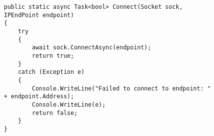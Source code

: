 \begin{figure}[h]
	\centering
	\begin{lstlisting}[label = code:asyncawaitex, caption=Example of async/await workflow, captionpos=b, basicstyle=\scriptsize]
public static async Task<bool> Connect(Socket sock, IPEndPoint endpoint)
{
    try
    {
        await sock.ConnectAsync(endpoint);
        return true;
    }
    catch (Exception e)
    {
        Console.WriteLine("Failed to connect to endpoint: " + endpoint.Address);
        Console.WriteLine(e);
        return false;
    }
}
	\end{lstlisting}
\end{figure}

\iffalse
\begin{figure}[h]
	\centering
	\begin{lstlisting}[label = code:asyncawaitex, caption=Example of async/await workflow, captionpos=b, basicstyle=\scriptsize]
public async Task SendMessage(byte[] sermessage, 
                              Socket sock, 
                              MessageType type)
{
    Console.WriteLine($"Sending: {type} message");
    var mesidentbytes = Serializer
                        .AddTypeIdentifierToBytes(sermessage, type);
    var fullbuffmes = NetworkFunctionality
                      .AddEndDelimiter(mesidentbytes);
    await sock.SendAsync(fullbuffmes, SocketFlags.None);
}


	\end{lstlisting}
\end{figure}
\fi


%
